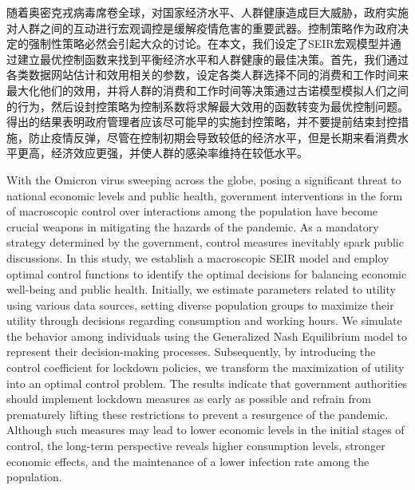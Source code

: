 \begin{abstractzh}
    随着奥密克戎病毒席卷全球，对国家经济水平、人群健康造成巨大威胁，政府实施对人群之间的互动进行宏观调控是缓解疫情危害的重要武器。控制策略作为政府决定的强制性策略必然会引起大众的讨论。在本文，我们设定了SEIR宏观模型并通过建立最优控制函数来找到平衡经济水平和人群健康的最佳决策。首先，我们通过各类数据网站估计和效用相关的参数，设定各类人群选择不同的消费和工作时间来最大化他们的效用，并将人群的消费和工作时间等决策通过古诺模型模拟人们之间的行为，然后设封控策略为控制系数将求解最大效用的函数转变为最优控制问题。得出的结果表明政府管理者应该尽可能早的实施封控策略，并不要提前结束封控措施，防止疫情反弹，尽管在控制初期会导致较低的经济水平，但是长期来看消费水平更高，经济效应更强，并使人群的感染率维持在较低水平。
\end{abstractzh}

\begin{abstracten}
    With the Omicron virus sweeping across the globe, posing a significant threat to national economic levels and public health, government interventions in the form of macroscopic control over interactions among the population have become crucial weapons in mitigating the hazards of the pandemic.   As a mandatory strategy determined by the government, control measures inevitably spark public discussions.   In this study, we establish a macroscopic SEIR model and employ optimal control functions to identify the optimal decisions for balancing economic well-being and public health.   Initially, we estimate parameters related to utility using various data sources, setting diverse population groups to maximize their utility through decisions regarding consumption and working hours.   We simulate the behavior among individuals using the Generalized Nash Equilibrium model to represent their decision-making processes.   Subsequently, by introducing the control coefficient for lockdown policies, we transform the maximization of utility into an optimal control problem.   The results indicate that government authorities should implement lockdown measures as early as possible and refrain from prematurely lifting these restrictions to prevent a resurgence of the pandemic.   Although such measures may lead to lower economic levels in the initial stages of control, the long-term perspective reveals higher consumption levels, stronger economic effects, and the maintenance of a lower infection rate among the population.
\end{abstracten}
